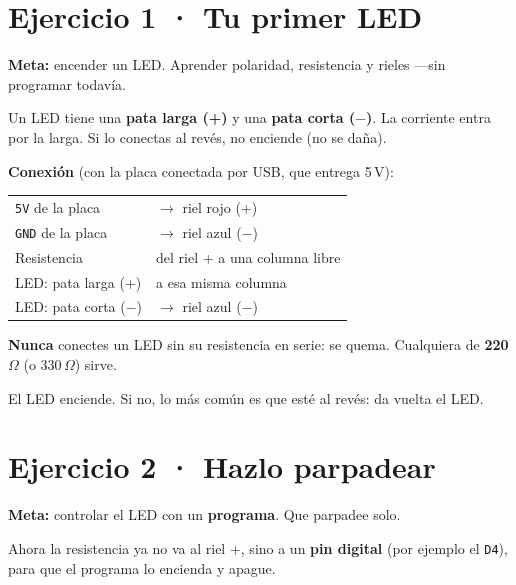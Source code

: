 \documentclass[10pt,letterpaper]{article}
\begin{document}
\section{Ejercicio 1 · Tu primer LED}
\begin{objetivo}\textbf{Meta:} encender un LED. Aprender polaridad, resistencia y rieles —sin
programar todavía.\end{objetivo}

Un LED tiene una \textbf{pata larga (+)} y una \textbf{pata corta ($-$)}. La corriente entra por
la larga. Si lo conectas al revés, no enciende (no se daña).

\textbf{Conexión} (con la placa conectada por USB, que entrega 5\,V):

\begin{tabularx}{\linewidth}{@{}L{5.2cm}Y@{}}
\hline
\texttt{5V} de la placa & $\rightarrow$ riel rojo (+)\\
\texttt{GND} de la placa & $\rightarrow$ riel azul ($-$)\\
Resistencia & del riel + a una columna libre\\
LED: pata larga (+) & a esa misma columna\\
LED: pata corta ($-$) & $\rightarrow$ riel azul ($-$)\\
\hline
\end{tabularx}

\begin{ojo}\textbf{Nunca} conectes un LED sin su resistencia en serie: se quema. Cualquiera de
\textbf{220\,$\Omega$} (o 330\,$\Omega$) sirve.\end{ojo}

\begin{veras}El LED enciende. Si no, lo más común es que esté al revés: da vuelta el LED.\end{veras}

\section{Ejercicio 2 · Hazlo parpadear}
\begin{objetivo}\textbf{Meta:} controlar el LED con un \textbf{programa}. Que parpadee solo.\end{objetivo}

Ahora la resistencia ya no va al riel +, sino a un \textbf{pin digital} (por ejemplo el
\texttt{D4}), para que el programa lo encienda y apague.
\end{document}
